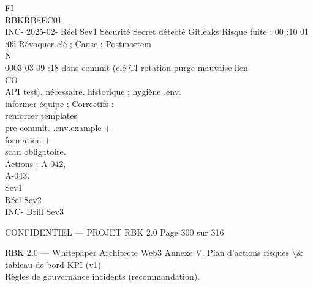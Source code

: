 \vspace{0.5em}
\vspace{0.5em}
\vspace{0.5em}
\vspace{0.5em}
FI\\
RBKRBSEC01\\
INC-   2025-02- Réel    Sev1    Sécurité Secret détecté   Gitleaks     Risque fuite ; 00 :10 01 :05 Révoquer clé ;    Cause :           Postmortem\\
\vspace{0.5em}
\vspace{0.5em}
\vspace{0.5em}
\vspace{0.5em}
N\\
0003   03 09 :18                         dans commit (clé CI           rotation                     purge             mauvaise          lien\\
\vspace{0.5em}
CO\\
API test).                    nécessaire.                  historique ;      hygiène .env.\\
informer équipe ; Correctifs :\\
renforcer         templates\\
pre-commit.       .env.example +\\
formation +\\
scan obligatoire.\\
Actions : A-042,\\
A-043.\\
Sev1\\
Réel    Sev2\\
INC-            Drill   Sev3\\
\vspace{0.5em}
\vspace{0.5em}
\vspace{0.5em}
\vspace{0.5em}
\begin{confidential}CONFIDENTIEL — PROJET RBK 2.0                                           Page 300 sur 316\end{confidential}
RBK 2.0 — Whitepaper Architecte Web3                                                                                         Annexe V. Plan d’actions risques \textbackslash{}& tableau de bord KPI (v1)\\
\vspace{0.5em}
\vspace{0.5em}
Règles de gouvernance incidents (recommandation).\\
